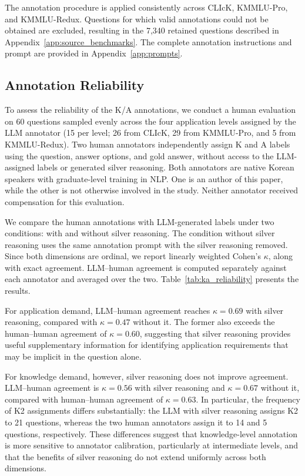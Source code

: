 The annotation procedure is applied consistently across CLIcK, KMMLU-Pro, and KMMLU-Redux.
Questions for which valid annotations could not be obtained are excluded, resulting in the 7,340 retained questions described in Appendix~\ref{app:source_benchmarks}.
The complete annotation instructions and prompt are provided in Appendix~\ref{app:prompts}.

\subsection{Annotation Reliability}

To assess the reliability of the K/A annotations, we conduct a human evaluation on 60 questions sampled evenly across the four application levels assigned by the LLM annotator (15 per level; 26 from CLIcK, 29 from KMMLU-Pro, and 5 from KMMLU-Redux).
Two human annotators independently assign K and A labels using the question, answer options, and gold answer, without access to the LLM-assigned labels or generated silver reasoning.
Both annotators are native Korean speakers with graduate-level training in NLP.
One is an author of this paper, while the other is not otherwise involved in the study.
Neither annotator received compensation for this evaluation.

We compare the human annotations with LLM-generated labels under two conditions: with and without silver reasoning.
The condition without silver reasoning uses the same annotation prompt with the silver reasoning removed.
Since both dimensions are ordinal, we report linearly weighted Cohen's $\kappa$, along with exact agreement.
LLM--human agreement is computed separately against each annotator and averaged over the two.
Table~\ref{tab:ka_reliability} presents the results.



For application demand, LLM--human agreement reaches $\kappa=0.69$ with silver reasoning, compared with $\kappa=0.47$ without it.
The former also exceeds the human--human agreement of $\kappa=0.60$, suggesting that silver reasoning provides useful supplementary information for identifying application requirements that may be implicit in the question alone.

For knowledge demand, however, silver reasoning does not improve agreement.
LLM--human agreement is $\kappa=0.56$ with silver reasoning and $\kappa=0.67$ without it, compared with human--human agreement of $\kappa=0.63$.
In particular, the frequency of K2 assignments differs substantially: the LLM with silver reasoning assigns K2 to 21 questions, whereas the two human annotators assign it to 14 and 5 questions, respectively.
These differences suggest that knowledge-level annotation is more sensitive to annotator calibration, particularly at intermediate levels, and that the benefits of silver reasoning do not extend uniformly across both dimensions.



